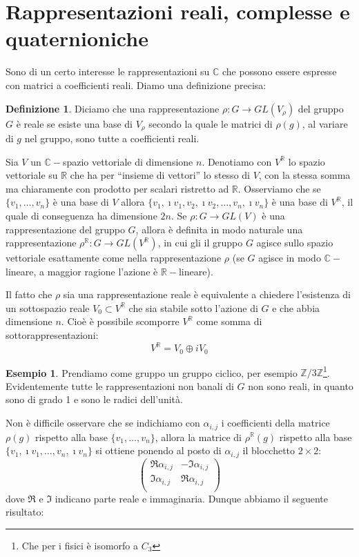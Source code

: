 \documentclass[11pt]{article}
\theoremstyle{plain}
\theoremstyle{definition}
\newtheorem{defn}{Definizione}[section]
\newtheorem{exmp}{Esempio}[section]
\theoremstyle{remark}
\newcommand{\C}{\mathbb{C}}
\newcommand{\R}{\mathbb{R}}
\newcommand{\Z}{\mathbb{Z}}
\begin{document}
\newpage
\section{Rappresentazioni reali, complesse e quaternioniche}

Sono di un certo interesse le rappresentazioni su $\C$ che possono essere espresse con matrici a coefficienti reali. Diamo una definizione precisa:

\begin{defn}
Diciamo che una rappresentazione $\rho:G\to GL(V_\rho)$ del gruppo $G$ è reale se esiste una base di $V_\rho$ secondo la quale
le matrici di $\rho(g)$, al variare di $g$ nel gruppo, sono tutte a coefficienti reali.
\label{def: rappr reale}
\end{defn}

Sia $V$ un $\C-$spazio vettoriale di dimensione $n$.
Denotiamo con $V^\R$ lo spazio vettoriale su $\R$ che ha per ``insieme di vettori''
lo stesso di $V$, con la stessa somma ma chiaramente con prodotto per scalari ristretto ad $\R$.
Osserviamo che se $\{v_1, \dots, v_n\}$ è una base di $V$ allora 
$\{v_1, \imath v_1, v_2, \imath v_2,\dots, v_n, \imath v_n\}$ è una base di $V^\R$, il quale di conseguenza ha dimensione $2n$.
Se $\rho:G\to GL(V)$ è una rappresentazione del gruppo $G$, allora è definita 
in modo naturale una rappresentazione $\rho^\R:G\to GL(V^\R)$, in cui gli il gruppo $G$
agisce sullo spazio vettoriale esattamente come nella rappresentazione $\rho$ (se $G$ agisce 
in modo $\C-$lineare, a maggior ragione l'azione è $\R-$lineare).

Il fatto che $\rho$ sia una rappresentazione reale è equivalente a chiedere l'esistenza di un sottospazio reale $V_0 \subset V^\R$ che sia stabile sotto l'azione di $G$ e che abbia dimensione $n$. Cioè è possibile scomporre $V^\R$ come somma di sottorappresentazioni:
\[ V^\R = V_0 \oplus i V_0 \]

\begin{exmp}
Prendiamo come gruppo un gruppo ciclico, per esempio $\Z / 3\Z$\footnote{Che per i fisici è isomorfo a $C_3$}. Evidentemente tutte le rappresentazioni non banali di $G$ non sono reali, in quanto sono di grado 1 e sono le radici dell'unità.
\end{exmp}

Non è difficile osservare che se indichiamo con $\alpha_{i,j}$ i coefficienti della matrice $\rho(g)$
rispetto alla base $\{v_1, \dots, v_n\}$, allora la matrice di $\rho^\R(g)$ rispetto alla base
$\{v_1, \imath v_1,\dots, v_n, \imath v_n\}$ si ottiene
ponendo al posto di $\alpha_{i,j}$ il blocchetto $2\times 2$:
\[\begin{pmatrix}
	\Re \alpha_{i,j} & -\Im \alpha_{i,j}\\
	\Im \alpha_{i,j} & \Re \alpha_{i,j}\\
\end{pmatrix}\]
dove $\Re$ e $\Im$ indicano parte reale e immaginaria.
Dunque abbiamo il seguente risultato:
\end{document}
